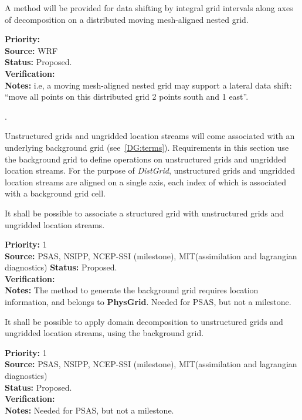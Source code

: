 A method will be provided for data shifting by integral grid intervals
along axes of decomposition on a distributed moving mesh-aligned
nested grid.

\begin{reqlist}
{\bf Priority:} \\
{\bf Source:} WRF \\
{\bf Status:} Proposed. \\
{\bf Verification:} \\
{\bf Notes:} i.e, a moving mesh-aligned nested grid may support a
  lateral data shift: ``move all points on this distributed grid 2
  points south and 1 east''.
\end{reqlist}

 \label{DG:Unstructured}.

Unstructured grids and ungridded location streams will come associated
with an underlying background grid (see~\ref{DG:terms}). Requirements
in this section use the background grid to define operations on
unstructured grids and ungridded location streams. For the purpose of
\emph{DistGrid}, unstructured grids and ungridded location streams are
aligned on a single axis, each index of which is associated with a
background grid cell.


It shall be possible to associate a structured grid with unstructured
grids and ungridded location streams.

\begin{reqlist}
{\bf Priority:} 1 \\ 
{\bf Source:} PSAS, NSIPP, NCEP-SSI (milestone), MIT(assimilation  and lagrangian diagnostics)
{\bf Status:} Proposed. \\
{\bf Verification:} \\
{\bf Notes:} The method to generate the background grid requires
  location information, and belongs to \textbf{PhysGrid}.  Needed
  for PSAS, but not a milestone.
\end{reqlist}


It shall be possible to apply domain decomposition to unstructured
grids and ungridded location streams, using the background grid.

\begin{reqlist}
{\bf Priority:} 1 \\ 
{\bf Source:} PSAS, NSIPP, NCEP-SSI (milestone), MIT(assimilation  and lagrangian diagnostics) \\
{\bf Status:} Proposed. \\ 
{\bf Verification:} \\
{\bf Notes:}  Needed for PSAS, but not a milestone.
\end{reqlist}

